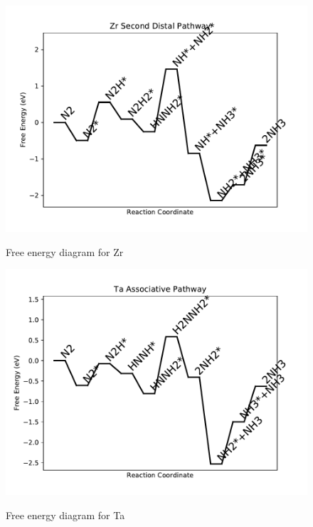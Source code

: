 \documentclass[journal=jacsat,manuscript=article]{achemso}
\begin{document}
\begin{figure}
\includegraphics[width=1\linewidth]{data/plots/Zr_distal_2.pdf}
\label{fig:Zr_distal_2}
\caption{Free energy diagram for Zr}
\end{figure}

\newpage
\begin{figure}
\includegraphics[width=1\linewidth]{data/plots/Ta_associative.pdf}
\label{fig:Ta_associative}
\caption{Free energy diagram for Ta}
\end{figure}
\end{document}
